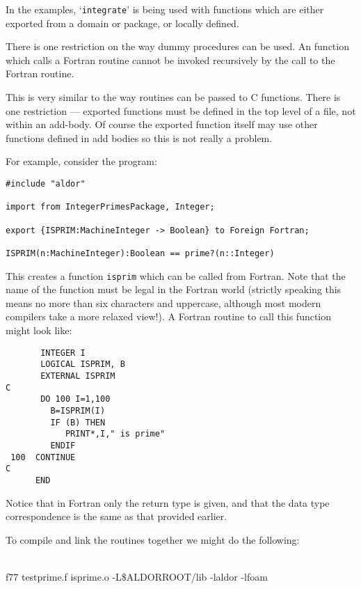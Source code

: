 In the examples, `{\tt integrate}' is being used with functions which
are either exported from a domain or package, or locally defined.

There is one restriction on the way dummy procedures can be used.  An
\asharp{} function which calls a Fortran routine cannot be invoked
recursively by the call to the Fortran routine.


This is very similar to the way \asharp{} routines can be passed to C
functions.  There is one restriction --- exported functions must be
defined in the top level of a file, not within an add-body.  Of course
the exported function itself may use other functions defined in add
bodies so this is not really a problem.

For example, consider the \asharp{} program:
\begin{small}
\begin{verbatim}
#include "aldor"

import from IntegerPrimesPackage, Integer;

export {ISPRIM:MachineInteger -> Boolean} to Foreign Fortran;

ISPRIM(n:MachineInteger):Boolean == prime?(n::Integer)
\end{verbatim}
\end{small}
This creates a function \verb`isprim` which can be called from
Fortran.  Note that the name of the function must be legal in the
Fortran world (strictly speaking this means no more than six
characters and uppercase, although most modern compilers take a more
relaxed view!).  A Fortran routine to call this function might look
like:
\begin{verbatim}
       INTEGER I
       LOGICAL ISPRIM, B
       EXTERNAL ISPRIM
C
       DO 100 I=1,100
         B=ISPRIM(I)
         IF (B) THEN
            PRINT*,I," is prime"
         ENDIF
 100  CONTINUE
C
      END
\end{verbatim}
Notice that in Fortran only the return type is given, and that the
data type correspondence is the same as that provided earlier.

To compile and link the routines together we might do the following:

\begin{small}
\osprompt {}\\
\osprompt f77 testprime.f isprime.o -L\$ALDORROOT/lib -laldor
-lfoam
\end{small}


